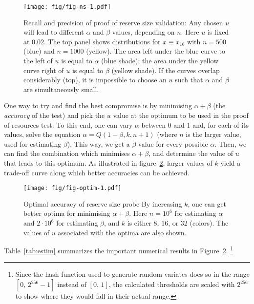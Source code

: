 \begin{figure}[!ht]
  \centering
  \texttt{[image: fig/fig-ns-1.pdf]}
  \caption[Recall and precision of proof of reserve size validation]{Recall and precision of proof of reserve size validation: Any chosen $u$ will lead to different $\alpha$ and $\beta$ values, depending on $n$. Here $u$ is fixed at $0.02$. The top panel shows distributions for $x \equiv x_{16}$ with $n = 500$ (blue) and $n = 1000$ (yellow). The area left under the blue curve to the left of $u$ is equal to $\alpha$ (blue shade); the area under the yellow curve right of $u$ is equal to $\beta$ (yellow shade). If the curves overlap considerably (top), it is impossible to choose an $u$ such that $\alpha$ and $\beta$ are simultaneously small.}
  \label{fig-ns}
\end{figure}


One way to try and find the best compromise is by minimising
$\alpha + \beta$ (the \emph{accuracy} of the test) and pick the $u$ value at the optimum to be used in the proof of resources test. To this end, one
can vary $\alpha$ between 0 and 1 and, for each of its values, solve
the equation $\alpha = Q(1-\beta, k, n+1)$ (where $n$ is the larger
value, used for estimating $\beta$). This way, we get a $\beta$
value for every possible $\alpha$. Then, we can find the combination
which minimises $\alpha + \beta$, and determine the value of $u$
that leads to this optimum. As illustrated in
figure~\ref{fig-optim}, larger values of $k$ yield a trade-off curve along which
better accuracies can be achieved.

\begin{figure}[!ht]
  \centering
  \texttt{[image: fig/fig-optim-1.pdf]}
  \caption[Optimal accuracy of reserve size probe]{Optimal accuracy of reserve size probe By increasing $k$, one can get better optima for minimising $\alpha + \beta$. Here $n = 10^6$ for estimating $\alpha$ and $2\cdot 10^6$ for estimating $\beta$, and $k$ is either 8, 16, or 32 (colors). The values of $u$ associated with the optima are also shown.}
  \label{fig-optim}
\end{figure}



Table~\ref{tab:estim} summarizes the important numerical results in
Figure~\ref{fig-optim}.%
%
\footnote{Since the hash function used to generate random
variates does so in the range $[0, \, 2^{256}-1]$ instead of
$[0, \, 1]$, the calculated thresholds are scaled with $2^{256}$ to
show where they would fall in their actual range.}


